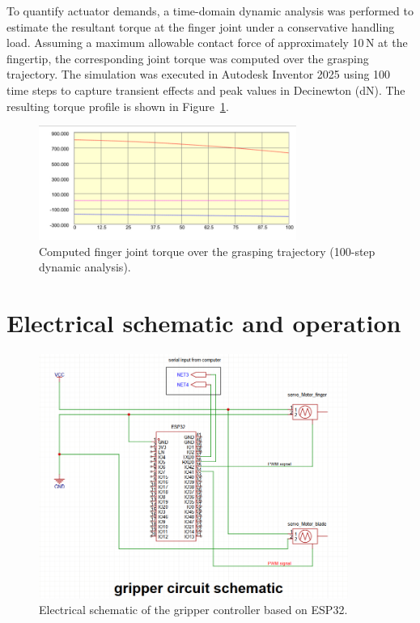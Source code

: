 To quantify actuator demands, a time-domain dynamic analysis was performed to estimate the
resultant torque at the finger joint under a conservative handling load. Assuming a maximum
allowable contact force of approximately 10\,N at the fingertip, the corresponding joint torque
was computed over the grasping trajectory. The simulation was executed in Autodesk Inventor
2025 using 100 time steps to capture transient effects and peak values in Decinewton (dN). The resulting torque
profile is shown in Figure~\ref{fig:finger_torque}.
\begin{figure}[H]
    \centering
    \includegraphics[width=0.75\textwidth]{fingerforceDynamics.png}
    \caption{Computed finger joint torque over the grasping trajectory (100-step dynamic analysis).}
    \label{fig:finger_torque}
    \end{figure}

    


\section{Electrical schematic and operation}


\begin{figure}[H]
    \centering
    \includegraphics[width=0.9\textwidth]{gripperschamatics.png}
    \caption{Electrical schematic of the gripper controller based on ESP32.}
    \label{fig:gripper_schematic}
    \end{figure}

